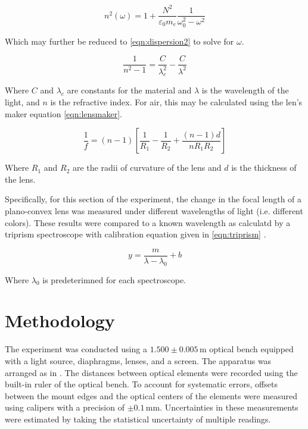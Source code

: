 \documentclass[aip, cp, amsmath, amssymb, reprint, nofootinbib]{revtex4-2}
\begin{document}
        \begin{equation} \label{eqn:dispersion}
            n^2(\omega) = 1 + \frac{N^2}{\varepsilon_0 m _e}\frac{1}{\omega_0^2 - \omega^2}
        \end{equation}

        Which may further be reduced \cite{labmanual} to \eqref{eqn:dispersion2} to solve for $\omega$.

        \begin{equation} \label{eqn:dispersion2}
            \frac{1}{n^2 - 1} = \frac{C}{\lambda_c^2} - \frac{C}{\lambda^2} 
        \end{equation}

        Where $C$ and $\lambda_c$ are constants for the material and $\lambda$ is the wavelength of the light, and $n$ is the refractive index. For air, this may be calculated using the len's maker equation \eqref{eqn:lensmaker}.

        \begin{equation} \label{eqn:lensmaker}
            \frac{1}{f} = (n-1)\left[\frac{1}{R_1} - \frac{1}{R_2} + \frac{(n-1)d}{n R_1 R_2}\right]
        \end{equation}

        Where $R_1$ and $R_2$ are the radii of curvature of the lens and $d$ is the thickness of the lens. 

        Specifically, for this section of the experiment, the change in the focal length of a plano-convex lens was measured under different wavelengths of light (i.e. different colors). These results were compared to a known wavelength as calculatd by a triprism spectroscope with calibration equation given in \eqref{eqn:triprism} \cite{labmanual}.

        \begin{equation} \label{eqn:triprism}
            y = \frac{m}{\lambda-\lambda_0} + b
        \end{equation}

        Where $\lambda_0$ is predeterimned for each spectroscope.

    \section{Methodology}

        The experiment was conducted using a $1.500\pm0.005\,\text{m}$ optical bench equipped with a light source, diaphragms, lenses, and a screen. The apparatus was arranged as in . The distances between optical elements were recorded using the built-in ruler of the optical bench. To account for systematic errors, offsets between the mount edges and the optical centers of the elements were measured using calipers with a precision of $\pm0.1\,\text{mm}$. Uncertainties in these measurements were estimated by taking the statistical uncertainty of multiple readings.
\end{document}
